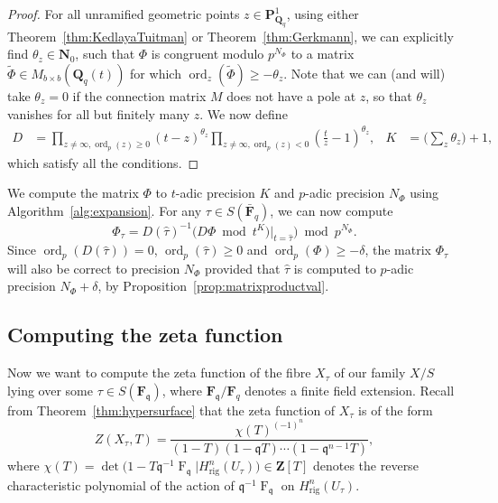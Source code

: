 \documentclass[a4paper,11pt]{article}
\numberwithin{equation}{section}
\newcommand{\NN}{\mathbf{N}} %
\newcommand{\ZZ}{\mathbf{Z}} %
\newcommand{\QQ}{\mathbf{Q}} %
\newcommand{\FF}{\mathbf{F}} %
\DeclareMathOperator{\ord}{ord}          %
\DeclareMathOperator{\Frob}{F}           %
\providecommand{\Hrig}{H_{\text{rig}}}  %
\theoremstyle{definition}
\begin{document}
\begin{proof}
For all unramified geometric points
$z \in \mathbf{P}^1_{\QQ_q}$, using either Theorem~\ref{thm:KedlayaTuitman} 
or Theorem~\ref{thm:Gerkmann}, we can explicitly find $\theta_{z} \in \NN_0$, 
such that $\Phi$ is congruent modulo $p^{N_{\Phi}}$ to a matrix 
$\tilde{\Phi} \in M_{b \times b}(\QQ_q(t))$ for which
$\ord_z(\tilde{\Phi}) \geq -\theta_z$.
Note that we can (and will) take $\theta_z=0$ if the connection matrix $M$ does not have 
a pole at $z$, so that $\theta_z$ vanishes for all but finitely many $z$. We now define 
\begin{align*}
D &= \prod_{z \neq \infty, \ord_p(z) \geq 0} (t-z)^{\theta_z}
    \prod_{z \neq \infty, \ord_p(z) < 0}(\frac{t}{z}-1)^{\theta_z}, 
&K&= \bigl(\sum_{z} \theta_z \bigr) +1,
\end{align*}
which satisfy all the conditions.
\end{proof}

We compute the matrix $\Phi$ to $t$-adic precision $K$ and $p$-adic
precision $N_{\Phi}$ using Algorithm~\ref{alg:expansion}. For any 
$\tau \in S(\bar{\FF}_q)$, we can now compute
\begin{equation*}
\Phi_{\tau} = D(\hat{\tau})^{-1}  \bigl( D \Phi \bmod{t^{K}} \bigr)|_{t=\hat{\tau}} \bigr) \bmod{p^{N_{\Phi}}}.
\end{equation*}
Since $\ord_p(D(\hat{\tau}))=0$, $\ord_p(\hat{\tau}) \geq 0$ and
$\ord_p(\Phi) \geq -\delta$, 
the matrix $\Phi_{\tau}$ will also be correct to precision $N_{\Phi}$ 
provided that $\hat{\tau}$ is computed to $p$-adic precision $N_{\Phi}+\delta$,
by Proposition~\ref{prop:matrixproductval}.

\subsection{Computing the zeta function}

Now we want to compute the zeta function of the fibre $X_{\tau}$ of
our family $X/S$ lying over some $\tau \in S(\FF_{\mathfrak{q}})$, 
where $\FF_{\mathfrak{q}}/\FF_q$ denotes a finite field extension.  
Recall from Theorem~\ref{thm:hypersurface} 
that the zeta function of $X_{\tau}$ is of the form
\begin{equation*}
Z(X_{\tau},T) = \frac{\chi(T)^{(-1)^n}}{(1 - T) (1 - \mathfrak{q}T) \dotsm (1 - \mathfrak{q}^{n-1}T)},
\end{equation*}
where $\chi(T) = \det \bigl( 1 - T \mathfrak{q}^{-1} \Frob_{\mathfrak{q}} | \Hrig^n(U_{\tau}) \bigr) \in \ZZ[T]$ 
denotes the reverse characteristic polynomial of the action 
of $\mathfrak{q}^{-1} \Frob_{\mathfrak{q}}$ 
on $\Hrig^n(U_{\tau})$.
\end{document}
